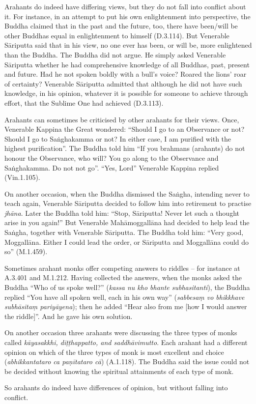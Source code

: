 
Arahants do indeed have differing views, but they do not fall into conflict about it. For instance, in an attempt to put his own enlightenment into perspective, the Buddha claimed that in the past and the future, too, there have been/will be other Buddhas equal in enlightenment to himself (D.3.114). But Venerable S\=ariputta said that in his view, no one ever has been, or will be, more enlightened than the Buddha. The Buddha did not argue. He simply asked Venerable S\=ariputta whether he had comprehensive knowledge of all Buddhas, past, present and future. Had he not spoken boldly with a bull's voice? Roared the lions' roar of certainty? Venerable S\=ariputta admitted that although he did not have such knowledge, in his opinion, whatever it is possible for someone to achieve through effort, that the Sublime One had achieved (D.3.113).

Arahants can sometimes be criticised by other arahants for their views. Once, Venerable Kappina the Great wondered: ``Should I go to an Observance or not? Should I go to Sa\.nghakamma or not? In either case, I am purified with the highest purification''. The Buddha told him ``If you brahmans (arahants) do not honour the Observance, who will? You go along to the Observance and Sa\.nghakamma. Do not not go''. ``Yes, Lord'' Venerable Kappina replied (Vin.1.105).

On another occasion, when the Buddha dismissed the Sa\.ngha, intending never to teach again, Venerable S\=ariputta decided to follow him into retirement to practise \textit{jh\=ana}. Later the Buddha told him: ``Stop, S\=ariputta! Never let such a thought arise in you again!'' But Venerable Mah\=amoggall\=ana had decided to help lead the Sa\.ngha, together with Venerable S\=ariputta. The Buddha told him: ``Very good, Moggall\=ana. Either I could lead the order, or S\=ariputta and Moggall\=ana could do so'' (M.1.459).

Sometimes arahant monks offer competing answers to riddles -- for instance at A.3.401 and M.1.212. Having collected the answers, when the monks asked the Buddha ``Who of us spoke well?'' (\textit{kassa nu kho bhante subhasitanti}), the Buddha replied ``You have all spoken well, each in his own way'' (\textit{sabbesaṃ vo bhikkhave subhāsitaṃ pariyāyena}); then he added ``Hear also from me [how I would answer the riddle]''. And he gave his own solution. 

On another occasion three arahants were discussing the three types of monks called \textit{kāyasakkhi, diṭṭhappatto, and saddhāvimutto}. Each arahant had a different opinion on which of the three types of monk is most excellent and choice (\textit{abhikkantataro ca paṇītataro cā}) (A.1.118). The Buddha said the issue could not be decided without knowing the spiritual attainments of each type of monk.

So arahants do indeed have differences of opinion, but without falling into conflict.
